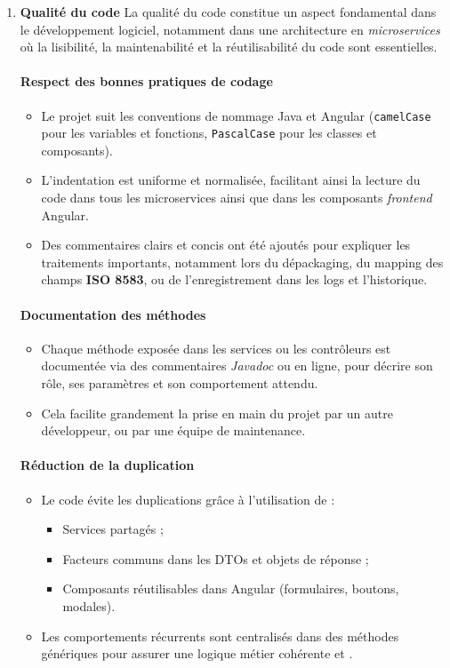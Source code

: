 \begin{enumerate}[label=\textbf{\alph*.}]
    \item \textbf{Qualité du code}
La qualité du code constitue un aspect fondamental dans le développement logiciel, notamment dans une architecture en \textit{microservices} où la lisibilité, la maintenabilité et la réutilisabilité du code sont essentielles.

\paragraph{Respect des bonnes pratiques de codage}
\begin{itemize}[label=\textbullet]
    \item Le projet suit les conventions de nommage Java et Angular (\texttt{camelCase} pour les variables et fonctions, \texttt{PascalCase} pour les classes et composants).
    \item L’indentation est uniforme et normalisée, facilitant ainsi la lecture du code dans tous les microservices ainsi que dans les composants \textit{frontend} Angular.
    \item Des commentaires clairs et concis ont été ajoutés pour expliquer les traitements importants, notamment lors du dépackaging, du mapping des champs \textbf{ISO 8583}, ou de l'enregistrement dans les logs et l’historique.
\end{itemize}

\paragraph{Documentation des méthodes}
\begin{itemize}[label=\textbullet]
    \item Chaque méthode exposée dans les services ou les contrôleurs est documentée via des commentaires \textit{Javadoc} ou en ligne, pour décrire son rôle, ses paramètres et son comportement attendu.
    \item Cela facilite grandement la prise en main du projet par un autre développeur, ou par une équipe de maintenance.
\end{itemize}

\paragraph{Réduction de la duplication}
\begin{itemize}[label=\textbullet]
    \item Le code évite les duplications grâce à l’utilisation de :
    \begin{itemize}[label=$\triangleright$, left=2em]
        \item Services partagés ;
        \item Facteurs communs dans les DTOs et objets de réponse ;
        \item Composants réutilisables dans Angular (formulaires, boutons, modales).
    \end{itemize}
    \item Les comportements récurrents sont centralisés dans des méthodes génériques pour assurer une logique métier cohérente et \textit{}.
\end{itemize}


\end{enumerate}
